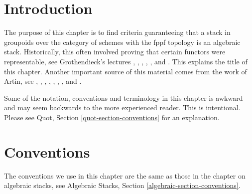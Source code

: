 \section{Introduction}
\label{criteria-section-introduction}
The purpose of this chapter is to find criteria guaranteeing that a
stack in groupoids over the category of schemes with the fppf topology
is an algebraic stack. Historically, this often involved proving that
certain functors were representable, see Grothendieck's lectures
\cite{Gr-I},
\cite{Gr-II},
\cite{Gr-III},
\cite{Gr-IV},
\cite{Gr-V}, and
\cite{Gr-VI}.
This explains the title of this chapter. Another important source
of this material comes from the work of Artin, see
\cite{ArtinI},
\cite{ArtinII},
\cite{Artin-Theorem-Representability},
\cite{Artin-Construction-Techniques},
\cite{Artin-Algebraic-Spaces},
\cite{Artin-Algebraic-Approximation},
\cite{Artin-Implicit-Function}, and
\cite{ArtinVersal}.

\medskip\noindent
Some of the notation, conventions and terminology in this chapter is awkward
and may seem backwards to the more experienced reader. This is intentional.
Please see Quot, Section \ref{quot-section-conventions} for an
explanation.

\section{Conventions}
\label{criteria-section-conventions}
The conventions we use in this chapter are the same as those in the
chapter on algebraic stacks, see
Algebraic Stacks, Section \ref{algebraic-section-conventions}.


